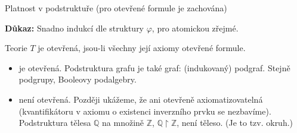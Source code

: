 \documentclass{beamer}
\begin{document}
\begin{frame}{Platnost v podstruktuře (pro otevřené formule je zachována)}
    
    
    

    \textbf{Důkaz:}
    Snadno indukcí dle struktury $\varphi$, pro atomickou zřejmé.\hfill\qedsymbol
    
    \medskip


    \medskip

    Teorie $T$ je \alert{otevřená}, jsou-li všechny její axiomy otevřené formule.


    \medskip

    \begin{itemize}
        \item {} je otevřená. Podstruktura grafu je také graf: (indukovaný) \alert{podgraf}. Stejně podgrupy, Booleovy podalgebry.
        \item {} není otevřená. Později ukážeme, že ani \alert{otevřeně axiomatizovatelná} (kvantifikátoru v axiomu o existenci inverzního prvku se nezbavíme). Podstruktura tělesa $\mathbb Q$ na množině $\mathbb Z$, $\mathbb Q\restriction\mathbb Z$, není těleso. (Je to tzv. \alert{okruh}.)
    \end{itemize}
    
\end{frame}
\end{document}
